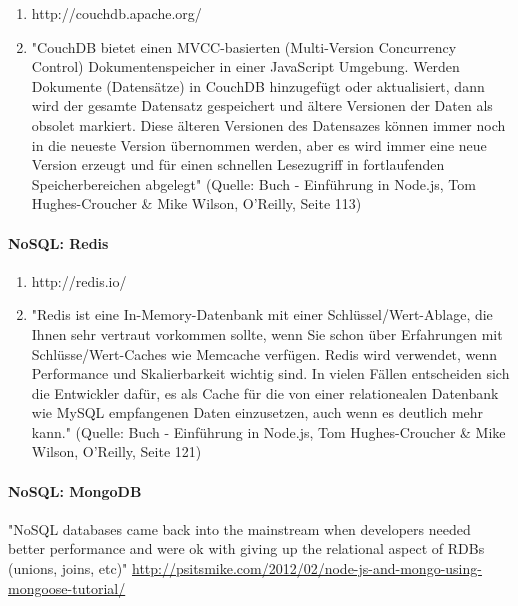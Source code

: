 \begin{enumerate}
\item http://couchdb.apache.org/
\item "CouchDB bietet einen MVCC-basierten (Multi-Version Concurrency Control) Dokumentenspeicher in einer JavaScript Umgebung. Werden Dokumente (Datens\"atze) in CouchDB hinzugef\"ugt oder aktualisiert, dann wird der gesamte Datensatz gespeichert und \"altere Versionen der Daten als obsolet markiert. Diese \"alteren Versionen des Datensazes k\"onnen immer noch in die neueste Version \"ubernommen werden, aber es wird immer eine neue Version erzeugt und f\"ur einen schnellen Lesezugriff in fortlaufenden Speicherbereichen abgelegt" \cite{hughes2012einfuhrung} (Quelle: Buch - Einf\"uhrung in Node.js, Tom Hughes-Croucher \& Mike Wilson, O'Reilly, Seite 113)
\end{enumerate}

\paragraph{NoSQL: Redis}

\begin{enumerate}
\item http://redis.io/
\item "Redis ist eine In-Memory-Datenbank mit einer Schl\"ussel/Wert-Ablage, die Ihnen sehr vertraut vorkommen sollte, wenn Sie schon \"uber Erfahrungen mit Schl\"usse/Wert-Caches wie Memcache verf\"ugen. Redis wird verwendet, wenn Performance und Skalierbarkeit wichtig sind. In vielen F\"allen entscheiden sich die Entwickler daf\"ur, es als Cache f\"ur die von einer relationealen Datenbank wie MySQL empfangenen Daten einzusetzen, auch wenn es deutlich mehr kann." \cite{hughes2012einfuhrung} (Quelle: Buch - Einf\"uhrung in Node.js, Tom Hughes-Croucher \& Mike Wilson, O'Reilly, Seite 121)
\end{enumerate}

\paragraph{NoSQL: MongoDB}

"NoSQL databases came back into the mainstream when developers needed better performance and were ok with giving up the relational aspect of RDBs (unions, joins, etc)" \url{http://psitsmike.com/2012/02/node-js-and-mongo-using-mongoose-tutorial/}

